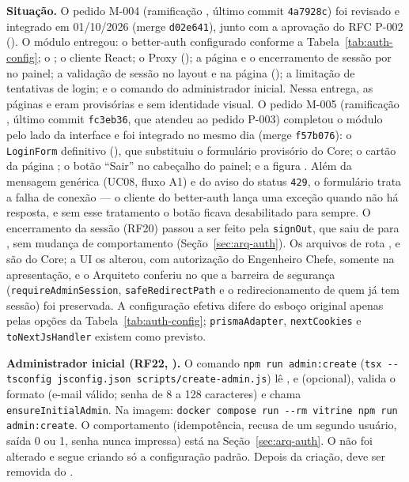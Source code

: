 \textbf{Situação.} O pedido M-004 (ramificação , último commit \texttt{4a7928c}) foi revisado e integrado em 01/10/2026 (merge \texttt{d02e641}), junto com a aprovação do RFC P-002 (). O módulo entregou: o better-auth configurado conforme a Tabela~\ref{tab:auth-config}; o  ; o cliente React; o Proxy (); a página  e o encerramento de sessão por  no painel; a validação de sessão no layout e na página  (); a limitação de tentativas de login; e o comando do administrador inicial. Nessa entrega, as páginas  e  eram provisórias e sem identidade visual. O pedido M-005 (ramificação , último commit \texttt{fc3eb36}, que atendeu ao pedido P-003) completou o módulo pelo lado da interface e foi integrado no mesmo dia (merge \texttt{f57b076}): o \texttt{LoginForm} definitivo (), que substituiu o formulário provisório do Core; o cartão da página ; o botão ``Sair'' no cabeçalho do painel; e a figura . Além da mensagem genérica (UC08, fluxo A1) e do aviso do status \texttt{429}, o formulário trata a falha de conexão --- o cliente do better-auth lança uma exceção quando não há resposta, e sem esse tratamento o botão ficava desabilitado para sempre. O encerramento da sessão (RF20) passou a ser feito pela  \texttt{signOut}, que saiu de  para , sem mudança de comportamento (Seção~\ref{sec:arq-auth}). Os arquivos de rota ,  e  são do Core; a UI os alterou, com autorização do Engenheiro Chefe, somente na apresentação, e o Arquiteto conferiu no  que a barreira de segurança (\texttt{requireAdminSession}, \texttt{safeRedirectPath} e o redirecionamento de quem já tem sessão) foi preservada. A configuração efetiva difere do esboço original apenas pelas opções da Tabela~\ref{tab:auth-config}; \texttt{prismaAdapter}, \texttt{nextCookies} e \texttt{toNextJsHandler} existem como previsto.

\textbf{Administrador inicial (RF22, ).} O comando \texttt{npm run admin:create} (\texttt{tsx -{}-tsconfig jsconfig.json scripts/create-admin.js}) lê ,  e  (opcional), valida o formato (e-mail válido; senha de 8 a 128 caracteres) e chama \texttt{ensureInitialAdmin}. Na imagem: \texttt{docker compose run -{}-rm vitrine npm run admin:create}. O comportamento (idempotência, recusa de um segundo usuário, saída 0 ou 1, senha nunca impressa) está na Seção~\ref{sec:arq-auth}. O  não foi alterado e segue criando só a configuração padrão. Depois da criação,  deve ser removida do .

